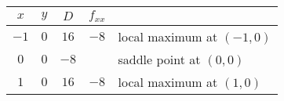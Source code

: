 \begin{tabular}{cc|cc|l}
	$x$ & $y$ & $D$ & $f_{xx}$ & \\
	\hline
	$-1$ & $0$ & $16$ & $-8$ & local maximum at $\left(-1, 0\right)$ \\
	$0$ & $0$ & $-8$ &  & saddle point at $\left(0, 0\right)$ \\
	$1$ & $0$ & $16$ & $-8$ & local maximum at $\left(1, 0\right)$
\end{tabular}


